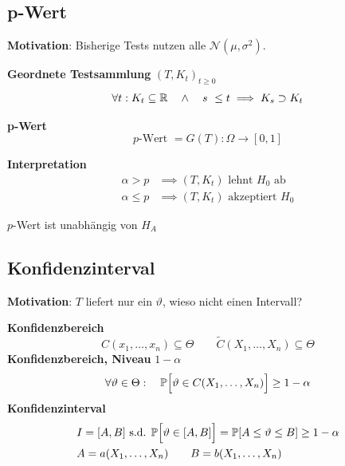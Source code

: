 \subsection{p-Wert}

\textbf{Motivation}: Bisherige Tests nutzen alle $\mathcal{N}(\mu,\sigma^2)$.


 \textbf{Geordnete Testsammlung} $(T,K_t)_{t\geq0}$
$$
    \forall t: K_t \subseteq \R \quad\land\quad s\ \leq t \implies K_s \supset K_t
$$

 \textbf{p-Wert}\\
$$
    p\text{-Wert } = G(T): \Omega \to [0,1]
$$

\remark \textbf{Interpretation}
\begin{align*}
    \alpha > p      &\implies (T, K_t) \text{ lehnt } H_0 \text{ ab} \\
    \alpha \leq p   &\implies (T, K_t) \text{ akzeptiert } H_0 
\end{align*}

{\footnotesize
    \remark $p$-Wert ist unabhängig von $H_A$
}

\newpage

\subsection{Konfidenzinterval}

\textbf{Motivation}: $T$ liefert nur ein $\vartheta$, wieso nicht einen Intervall?

 \textbf{Konfidenzbereich}
$$
    C(x_1,\ldots,x_n) \subseteq \Theta \qquad \tilde{C}(X_1,\ldots,X_n) \subseteq \Theta
$$
 \textbf{Konfidenzbereich, Niveau} $1-\alpha$
$$
    \forall \vartheta \in \Theta:\quad \P\Bigl[ \vartheta \in C(X_1,\ldots,X_n)\Bigr] \geq 1-\alpha 
$$
 \textbf{Konfidenzinterval}\\
\begin{align*}
    &   I = [A,B] \text{ s.d. } \P\Bigl[ \vartheta \in [A,B] \Bigr] = \P[A\leq\vartheta\leq B] \geq 1-\alpha \\
    &   A = a(X_1,\ldots,X_n) \qquad B = b(X_1,\ldots,X_n)
\end{align*}

